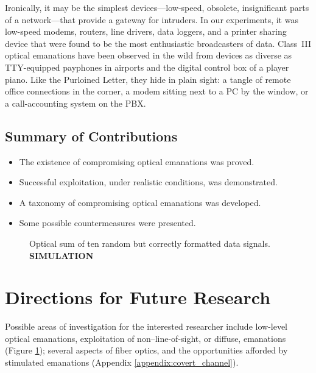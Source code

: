 \documentclass{acmtrans2e}
\begin{document}
Ironically, it may be the simplest devices---low-speed, 
obsolete, insignificant parts of a network---that provide a gateway 
for intruders.  In our experiments, it was low-speed modems, 
routers, line drivers, data loggers, and a printer sharing device that
were found to be the most enthusiastic broadcasters of data. 
Class~III optical emanations have been observed in the wild from
devices as diverse as TTY-equipped payphones in airports and the
digital control box of a player piano.  Like the Purloined 
Letter, they hide in plain sight: a tangle of 
remote office connections in the corner, a modem sitting next to a PC by 
the window, or a call-accounting system on the PBX.

\subsection{Summary of Contributions}

\begin{itemize}

\item The existence of compromising optical emanations was proved.

\item Successful exploitation, under realistic conditions, was 
demonstrated.

\item A taxonomy of compromising optical emanations was developed.

\item Some possible countermeasures were presented.

\end{itemize}

\begin{figure}
\centering
\caption{Optical sum of ten random but correctly formatted data
signals.  {\bf SIMULATION}}
\label{diffuse_emanations_figure}
\end{figure}

\section{Directions for Future Research}

Possible areas of investigation for the interested researcher include
low-level optical emanations, exploitation of non--line-of-sight, or
diffuse, emanations (Figure \ref{diffuse_emanations_figure}); several
aspects of fiber optics, and the opportunities afforded by stimulated
emanations (Appendix \ref{appendix:covert_channel}).
\end{document}
